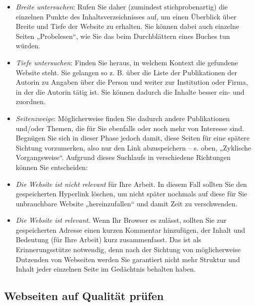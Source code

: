 \documentclass[]{book}
\theoremstyle{definition}
\theoremstyle{definition}
\theoremstyle{definition}
\theoremstyle{remark}
\begin{document}
\begin{itemize}
{  prüfen}).
\item
  \emph{Breite untersuchen}: Rufen Sie daher (zumindest
  stichprobenartig) die einzelnen Punkte des Inhaltsverzeichnisses auf,
  um einen Überblick über Breite und Tiefe der Website zu erhalten. Sie
  können dabei auch einzelne Seiten „Probelesen``, wie Sie das beim
  Durchblättern eines Buches tun würden.
\item
  \emph{Tiefe untersuchen}: Finden Sie heraus, in welchem Kontext die
  gefundene Website steht. Sie gelangen so z. B. über die Liste der
  Publikationen der Autorin zu Angaben über die Person und weiter zur
  Institution oder Firma, in der die Autorin tätig ist. Sie können
  dadurch die Inhalte besser ein- und zuordnen.
\item
  \emph{Seitenzweige}: Möglicherweise finden Sie dadurch andere
  Publikationen und/oder Themen, die für Sie ebenfalls oder noch mehr
  von Interesse sind. Begnügen Sie sich in dieser Phase jedoch damit,
  diese Seiten für eine spätere Sichtung vorzumerken, also nur den Link
  abzuspeichern -- s. oben, „Zyklische Vorgangsweise``. Aufgrund dieses
  Suchlaufs in verschiedene Richtungen können Sie entscheiden:
\item
  \emph{Die Website ist nicht relevant} für Ihre Arbeit. In diesem Fall
  sollten Sie den gespeicherten Hyperlink löschen, um nicht später
  nochmals auf diese für Sie unbrauchbare Website „hereinzufallen`` und
  damit Zeit zu verschwenden.
\item
  \emph{Die Website ist relevant}. Wenn Ihr Browser es zulässt, sollten
  Sie zur gespeicherten Adresse einen kurzen Kommentar hinzufügen, der
  Inhalt und Bedeutung (für Ihre Arbeit) kurz zusammenfasst. Das ist als
  Erinnerungsstütze notwendig, denn nach der Sichtung von möglicherweise
  Dutzenden von Webseiten werden Sie garantiert nicht mehr Struktur und
  Inhalt jeder einzelnen Seite im Gedächtnis behalten haben.
\end{itemize}

\hypertarget{webseiten-qualitaet}{\subsection{Webseiten auf Qualität
prüfen}\label{webseiten-qualitaet}}
\end{document}
